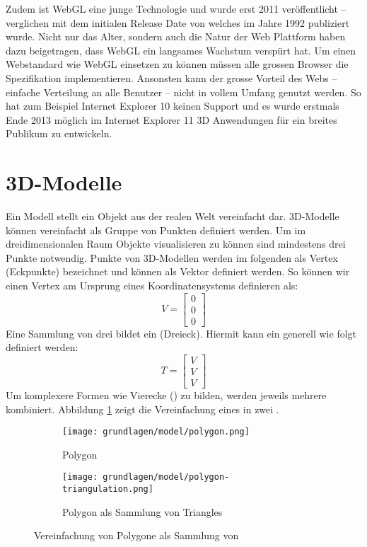 Zudem ist WebGL eine junge Technologie und wurde erst 2011 veröffentlicht – verglichen mit dem initialen Release Date von  welches im Jahre 1992 publiziert wurde. \cite{webGl1Spec,openGlSpec}
Nicht nur das Alter, sondern auch die Natur der Web Plattform haben dazu beigetragen, dass WebGL ein langsames Wachstum verspürt hat. Um einen Webstandard wie WebGL einsetzen zu können müssen alle grossen Browser die Spezifikation implementieren. Ansonsten kann der grosse Vorteil des Webs – einfache Verteilung an alle Benutzer – nicht in vollem Umfang genutzt werden. So hat zum Beispiel Internet Explorer 10 keinen Support und es wurde erstmals Ende 2013 möglich im Internet Explorer 11 3D Anwendungen für ein breites Publikum zu entwickeln.

\section{3D-Modelle}
Ein Modell stellt ein Objekt aus der realen Welt vereinfacht dar.
3D-Modelle können vereinfacht als Gruppe von Punkten definiert werden.
Um im dreidimensionalen Raum Objekte visualisieren zu können sind mindestens drei Punkte notwendig.
Punkte von 3D-Modellen werden im folgenden als Vertex (Eckpunkte) bezeichnet und können als Vektor definiert werden.
So können wir einen Vertex am Ursprung eines Koordinatensystems definieren als:
$$ V =
\begin{bmatrix}
  0 \\
  0 \\
  0
\end{bmatrix}
$$
Eine Sammlung von drei  bildet ein  (Dreieck). Hiermit kann ein  generell wie folgt definiert werden:
$$ T =
\begin{bmatrix}
  V \\
  V \\
  V
\end{bmatrix}
$$
Um komplexere Formen wie Vierecke () zu bilden, werden jeweils mehrere  kombiniert. Abbildung \ref{fig:modelSimpleTriangulation} zeigt die Vereinfachung eines  in zwei .
\begin{figure}[H]
  \centering
  \begin{subfigure}{.5\textwidth}
    \centering
    \texttt{[image: grundlagen/model/polygon.png]}
    \caption{Polygon}
  \end{subfigure}%
  \begin{subfigure}{.5\textwidth}
    \centering
    \texttt{[image: grundlagen/model/polygon-triangulation.png]}
    \caption{Polygon als Sammlung von Triangles}
  \end{subfigure}
  \caption{Vereinfachung von Polygone als Sammlung von }
  \label{fig:modelSimpleTriangulation}
\end{figure}


